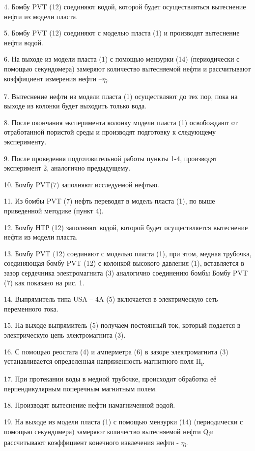 \begin{multicols}{2}
4. Бомбу PVT (12) соединяют водой, которой будет осуществляться
вытеснение нефти из модели пласта.

5. Бомбу PVT (12) соединяют с моделью пласта (1) и производят вытеснение
нефти водой.

6. На выходе из модели пласта (1) с помощью мензурки (14) (периодически
с помощью секундомера) замеряют количество вытесняемой нефти и
рассчитывают коэффициент измерения нефти --\(\eta\)\textsubscript{i}.

7. Вытеснение нефти из модели пласта (1) осуществляют до тех пор, пока
на выходе из колонки будет выходить только вода.

8. После окончания эксперимента колонку модели пласта (1) освобождают от
отработанной пористой среды и производят подготовку к следующему
эксперименту.

9. После проведения подготовительной работы пункты 1-4, производят
эксперимент 2, аналогично предыдущему.

10. Бомбу PVT(7) заполняют исследуемой нефтью.

11. Из бомбы PVT (7) нефть переводят в модель пласта (1), по выше
приведенной методике (пункт 4).

12. Бомбу НTР (12) заполняют водой, которой будет осуществляется
вытеснение нефти из модели пласта.

13. Бомбу PVT (12) соединяют с моделью пласта (1), при этом, медная
трубочка, соединяющая бомбу PVT (12) с колонкой высокого давления (1),
вставляется в зазор сердечника электромагнита (3) аналогично соединению
бомбы Бомбу PVT (7) как показано на рис. 1.

14. Выпрямитель типа USA -- 4A (5) включается в электрическую сеть
переменного тока.

15. На выходе выпрямитель (5) получаем постоянный ток, который подается
в электрическую цепь электромагнита (3).

16. С помощью реостата (4) и амперметра (6) в зазоре электромагнита (3)
устанавливается определенная напряженность магнитного поля
H\textsubscript{i}.

17. При протекании воды в медной трубочке, происходит обработка её
перпендикулярным поперечным магнитным полем.

18. Производят вытеснение нефти намагниченной водой.

19. На выходе из модели пласта (1) с помощью мензурки (14) (периодически
с помощью секундомера) замеряют количество вытесняемой нефти
Q\textsubscript{i}и рассчитывают коэффициент конечного извлечения нефти
- \(\eta\)\textsubscript{i}.


\end{multicols}
